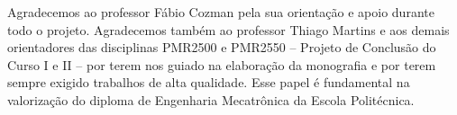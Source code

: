 \begin{agradecimentos}
Agradecemos ao professor Fábio Cozman pela sua orientação e apoio durante todo o projeto. Agradecemos também ao professor Thiago Martins e aos demais orientadores das disciplinas PMR2500 e PMR2550 -- Projeto de Conclusão do Curso I e II -- por terem nos guiado na elaboração da monografia e por terem sempre exigido trabalhos de alta qualidade. Esse papel é fundamental na valorização do diploma de Engenharia Mecatrônica da Escola Politécnica. 
\end{agradecimentos}